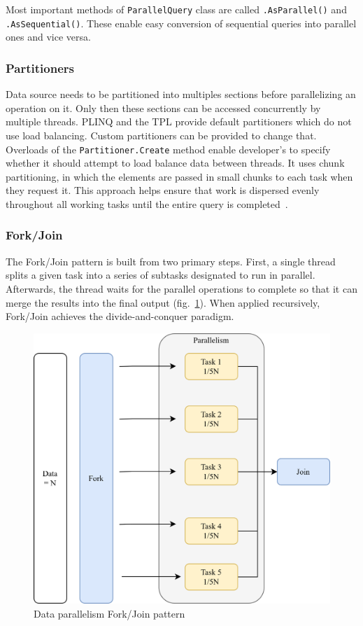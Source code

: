 Most important methods of \texttt{ParallelQuery} class are called \texttt{.AsParallel()} and \texttt{.AsSequential()}. These enable easy conversion of sequential queries into parallel ones and vice versa.

\subsubsection{Partitioners}
\label{sec:Partitioners}
Data source needs to be partitioned into multiples sections before parallelizing an operation on it. Only then these sections can be accessed concurrently by multiple threads. PLINQ and the TPL provide default partitioners which do not use load balancing. Custom partitioners can be provided to change that. Overloads of the \texttt{Partitioner.Create} method enable developer's to specify whether it should attempt to load balance data between threads. It uses chunk partitioning, in which the elements are passed in small chunks to each task when they request it. This approach helps ensure that work is dispersed evenly throughout all working tasks until the entire query is completed~\cite{Partitioners}.

\subsubsection{Fork/Join}
\label{sec:ForkJoin}
The Fork/Join pattern is built from two primary steps. First, a single thread splits a given task into a series of subtasks designated to run in parallel. Afterwards, the thread waits for the parallel operations to complete so that it can merge the results into the final output (fig.~\ref{fig:ForkJoin}). When applied recursively, Fork/Join achieves the divide-and-conquer paradigm.
\begin{figure}[htb]
	\centering
		\includegraphics[scale=1.0]{figures02/forkjoin.png}
		\caption{Data parallelism Fork/Join pattern}
		\label{fig:ForkJoin}
\end{figure}

